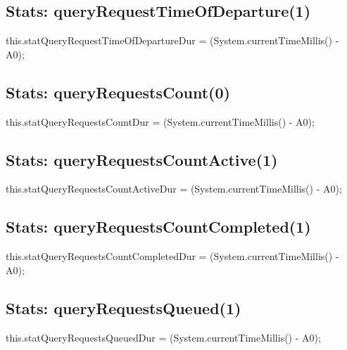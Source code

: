 \subsection{Stats: queryRequestTimeOfDeparture(1)}
\nwenddocs{}\endmoddef{}
this.statQueryRequestTimeOfDepartureDur = (System.currentTimeMillis() - A0);
\nwendcode{}\nwdocspar

\subsection{Stats: queryRequestsCount(0)}
\nwenddocs{}\endmoddef{}
this.statQueryRequestsCountDur = (System.currentTimeMillis() - A0);
\nwendcode{}\nwdocspar

\subsection{Stats: queryRequestsCountActive(1)}
\nwenddocs{}\endmoddef{}
this.statQueryRequestsCountActiveDur = (System.currentTimeMillis() - A0);
\nwendcode{}\nwdocspar

\subsection{Stats: queryRequestsCountCompleted(1)}
\nwenddocs{}\endmoddef{}
this.statQueryRequestsCountCompletedDur = (System.currentTimeMillis() - A0);
\nwendcode{}\nwdocspar

\subsection{Stats: queryRequestsQueued(1)}
\nwenddocs{}\endmoddef{}
this.statQueryRequestsQueuedDur = (System.currentTimeMillis() - A0);
\nwendcode{}\nwdocspar


